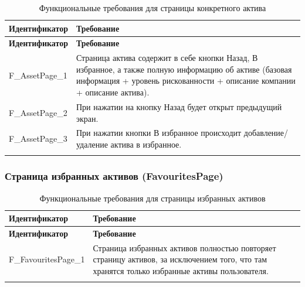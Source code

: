 \documentclass[a4paper, 14pt]{article}
\begin{document}
\begin{longtable}{| p{} | p{} |}
    \hline
    \textbf{Идентификатор}          & \textbf{Требование}                                                                                                                                                                \\
    \hline
    \endfirsthead
    \hline
    \textbf{Идентификатор}          & \textbf{Требование}                                                                                                                                                                \\
    \hline
    \endhead

    F\_AssetPage\_1                 & Страница актива содержит в себе кнопки Назад, В избранное, а также полную информацию об активе (базовая информация + уровень рискованности + описание компании + описание актива).                         \\ \hline
    F\_AssetPage\_2                 & При нажатии на кнопку Назад будет открыт предыдущий экран.                                                                                                                         \\ \hline
    F\_AssetPage\_3                 & При нажатии кнопки В избранное происходит добавление/удаление актива в избранное.                                                                                                  \\ \hline

    \caption{Функциональные требования для страницы конкретного актива}
\end{longtable}

\subsubsection{Страница избранных активов (FavouritesPage)}

\begin{longtable}{| p{} | p{} |}
    \hline
    \textbf{Идентификатор}          & \textbf{Требование}                                                                                                                                                                \\
    \hline
    \endfirsthead
    \hline
    \textbf{Идентификатор}          & \textbf{Требование}                                                                                                                                                                \\
    \hline
    \endhead

    F\_FavouritesPage\_1            & Страница избранных активов полностью повторяет страницу активов, за исключением того, что там хранятся только избранные активы пользователя.                                       \\ \hline

    \caption{Функциональные требования для страницы избранных активов}
\end{longtable}
\end{document}
